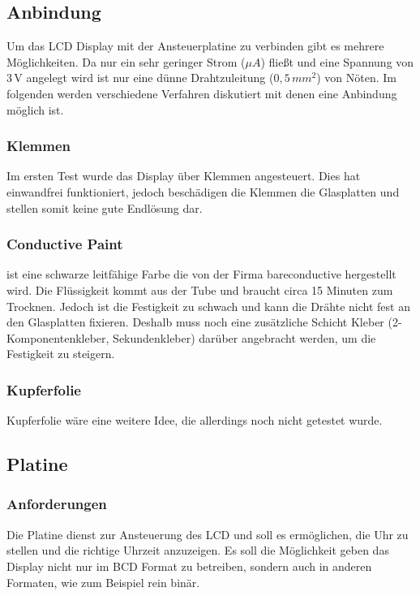 \subsection{Anbindung}
Um das LCD Display mit der Ansteuerplatine zu verbinden gibt es mehrere Möglichkeiten. Da nur ein sehr geringer Strom (\(\mu A\)) fließt und eine Spannung von \(3\,\textrm{V}\) angelegt wird ist nur eine dünne Drahtzuleitung (\(0,5\, mm^2\)) von Nöten. Im folgenden werden verschiedene Verfahren diskutiert mit denen eine Anbindung möglich ist.\\

\subsubsection{Klemmen}
Im ersten Test wurde das Display über Klemmen angesteuert. Dies hat einwandfrei funktioniert, jedoch beschädigen die Klemmen die Glasplatten und stellen somit keine gute Endlösung dar.\\

\subsubsection{Conductive Paint}
\cite[\textit{Conductive Paint}]{conductivepaint} ist eine schwarze leitfähige Farbe die von der Firma bareconductive hergestellt wird. Die Flüssigkeit kommt aus der Tube und braucht circa 15 Minuten zum Trocknen. Jedoch ist die Festigkeit zu schwach und kann die Drähte nicht fest an den Glasplatten fixieren. Deshalb muss noch eine zusätzliche Schicht Kleber (2-Komponentenkleber, Sekundenkleber) darüber angebracht werden, um die Festigkeit zu steigern.\\

\subsubsection{Kupferfolie}
Kupferfolie wäre eine weitere Idee, die allerdings noch nicht getestet wurde.\\


\subsection{Platine}\label{subsec:platine}

\subsubsection{Anforderungen}
Die Platine dienst zur Ansteuerung des LCD und soll es ermöglichen, die Uhr zu stellen und die richtige Uhrzeit anzuzeigen. Es soll die Möglichkeit geben das Display nicht nur im BCD Format zu betreiben, sondern auch in anderen Formaten, wie zum Beispiel rein binär.\\


